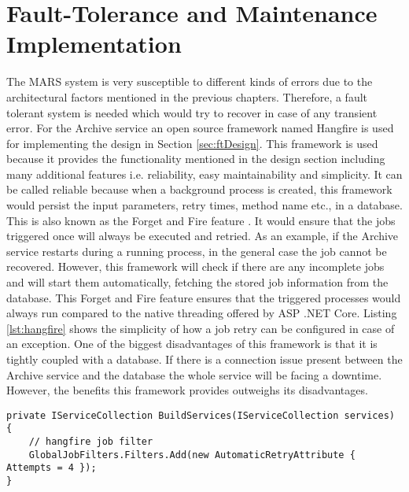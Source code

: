 \newpage
\section{Fault-Tolerance and Maintenance Implementation}
The MARS system is very susceptible to different kinds of errors due to the architectural factors mentioned in the previous chapters. Therefore, a fault tolerant
system is needed which would try to recover in case of any transient error. For the Archive service an open source framework
named Hangfire is used for implementing the design in Section \ref{sec:ftDesign}. This framework is used because it provides
the functionality mentioned in the design section including many additional features i.e. reliability, easy maintainability and simplicity. It can be called
reliable because when a background process is created, this framework would persist the input parameters, retry times, method name etc., in a database. 
This is also known as the Forget and Fire feature \cite{Hangfire}. It would
ensure that the jobs triggered once will always be executed and retried. As an example, if the
Archive service restarts during a running process, in the general case the job cannot be recovered. However, this framework will check if 
there are any incomplete jobs and will start them automatically, fetching the stored job information from the database. This Forget and Fire 
feature ensures that the triggered processes would always run compared to the native threading offered by ASP .NET Core.
Listing \ref{lst:hangfire}
shows the simplicity of how a job retry can be configured in case of an exception. One of the biggest disadvantages of this framework is that it is 
tightly coupled
with a database. If there is a connection issue present between the Archive service and the database the whole service will be facing a downtime. However, the 
benefits this framework provides outweighs its disadvantages.

\begin{lstlisting}[language={[Sharp]C}, caption={Hangfire retry attempt configuration}, captionpos=b,label={lst:hangfire}]
private IServiceCollection BuildServices(IServiceCollection services)
{
    // hangfire job filter
    GlobalJobFilters.Filters.Add(new AutomaticRetryAttribute { Attempts = 4 });
}
\end{lstlisting}


